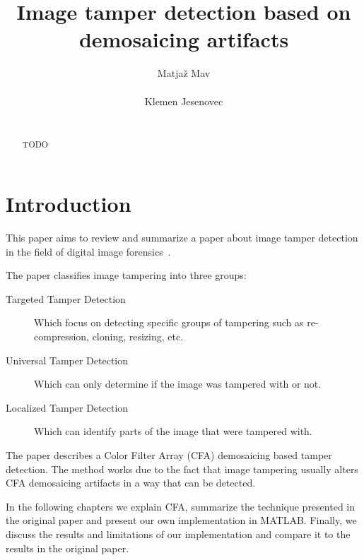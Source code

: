 \documentclass{template/acm_proc_article-sp}
\begin{document}
 

\title{Image tamper detection based on demosaicing artifacts}

\author{
\alignauthor
Matjaž Mav\\
       \\
\alignauthor
Klemen Jesenovec\\
       \\
}

\maketitle
\begin{abstract}
TODO
\end{abstract}


\section{Introduction}
This paper aims to review and summarize a paper about image tamper 
detection in the field of digital image forensics~\cite{dirik2009image}.

The paper classifies image tampering into three groups: 
\begin{description}
    \item[Targeted Tamper Detection] Which focus on detecting specific groups of 
    tampering such as re-compression, cloning, resizing, etc. 
    \item[Universal Tamper Detection] Which can only determine if the image
    was tampered with or not.
    \item[Localized Tamper Detection] Which can identify parts of the image 
    that were tampered with.
\end{description}

The paper describes a Color Filter Array (CFA) demosaicing based tamper detection.
The method works due to the fact that image tampering usually alters CFA demosaicing
artifacts in a way that can be detected. 

In the following chapters we explain CFA, summarize the technique presented 
in the original paper and present our own implementation in MATLAB.
Finally, we discuss the results and limitations of our implementation and compare it
to the results in the original paper.
\end{document}
